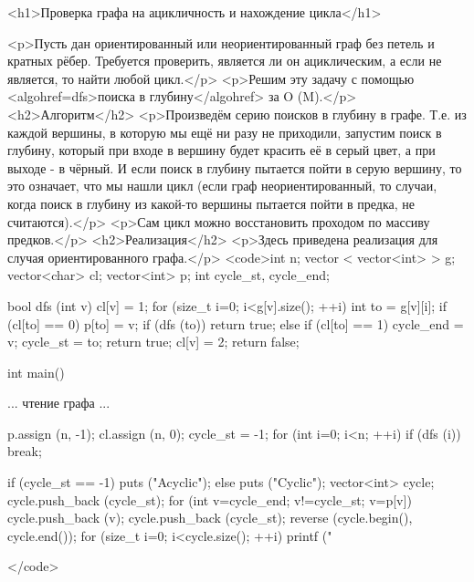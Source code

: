 <h1>Проверка графа на ацикличность и нахождение цикла</h1>

<p>Пусть дан ориентированный или неориентированный граф без петель и кратных рёбер. Требуется проверить, является ли он ациклическим, а если не является, то найти любой цикл.</p>
<p>Решим эту задачу с помощью <algohref=dfs>поиска в глубину</algohref> за O (M).</p>
<h2>Алгоритм</h2>
<p>Произведём серию поисков в глубину в графе. Т.е. из каждой вершины, в которую мы ещё ни разу не приходили, запустим поиск в глубину, который при входе в вершину будет красить её в серый цвет, а при выходе - в чёрный. И если поиск в глубину пытается пойти в серую вершину, то это означает, что мы нашли цикл (если граф неориентированный, то случаи, когда поиск в глубину из какой-то вершины пытается пойти в предка, не считаются).</p>
<p>Сам цикл можно восстановить проходом по массиву предков.</p>
<h2>Реализация</h2>
<p>Здесь приведена реализация для случая ориентированного графа.</p>
<code>int n;
vector < vector<int> > g;
vector<char> cl;
vector<int> p;
int cycle_st, cycle_end;

bool dfs (int v) {
	cl[v] = 1;
	for (size_t i=0; i<g[v].size(); ++i) {
		int to = g[v][i];
		if (cl[to] == 0) {
			p[to] = v;
			if (dfs (to))  return true;
		}
		else if (cl[to] == 1) {
			cycle_end = v;
			cycle_st = to;
			return true;
		}
	}
	cl[v] = 2;
	return false;
}

int main() {
	... чтение графа ...

	p.assign (n, -1);
	cl.assign (n, 0);
	cycle_st = -1;
	for (int i=0; i<n; ++i)
		if (dfs (i))
			break;

	if (cycle_st == -1)
		puts ("Acyclic");
	else {
		puts ("Cyclic");
		vector<int> cycle;
		cycle.push_back (cycle_st);
		for (int v=cycle_end; v!=cycle_st; v=p[v])
			cycle.push_back (v);
		cycle.push_back (cycle_st);
		reverse (cycle.begin(), cycle.end());
		for (size_t i=0; i<cycle.size(); ++i)
			printf ("%
	}
}</code>